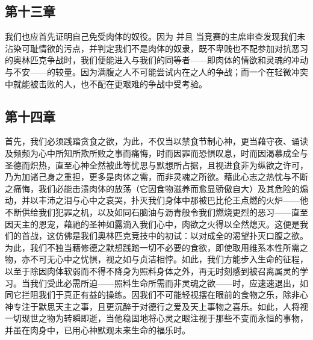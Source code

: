 
\subsection{第十三章}

\par

我们也应首先证明自己免受肉体的奴役。因为  并且  当竞赛的主席审查发现我们未沾染可耻情欲的污点，并判定我们不是肉体的奴隶，既不卑贱也不配参加对抗恶习的奥林匹克争战时，我们便能进入与我们的同等者——即肉体的情欲和灵魂的冲动与不安——的较量。因为满腹之人不可能尝试内在之人的争战；而一个在轻微冲突中就能被击败的人，也不配在更艰难的争战中受考验。\par


\subsection{第十四章}

\par

首先，我们必须践踏贪食之欲，为此，不仅当以禁食节制心神，更当藉守夜、诵读及频频为心中所知所欺所败之事而痛悔，时而因罪而恐惧叹息，时而因渴慕成全与圣德而炽热，直至心神全然被此等忧思与默想所占据，且视进食非为纵欲之许可，乃为加诸己身之重担，更多是肉体之需，而非灵魂之所欲。藉此心志之热忱与不断之痛悔，我们必能击溃肉体的放荡（它因食物滋养而愈显骄傲自大）及其危险的煽动，并以丰沛之泪与心中之哀哭，扑灭我们身体中那被巴比伦王点燃的火炉——他不断供给我们犯罪之机，以及如同石脑油与沥青般令我们燃烧更烈的恶习——直至因天主的恩宠，藉祂的圣神如露滴入我们心中，肉欲之火得以全然熄灭。这便是我们的首战，这仿佛是我们奥林匹克竞技中的初试：以对成全的渴望扑灭口腹之欲。为此，我们不独当藉修德之默想践踏一切不必要的食欲，即使取用维系本性所需之物，亦不可无心中之忧惧，视之如与贞洁相悖。如此，我们方能步入生命的征程，以至于除因肉体软弱而不得不降身为照料身体之外，再无时刻感到被召离属灵的学习。当我们受此必需所迫——照料生命所需而非灵魂之欲——时，应速速退出，如同它拦阻我们于真正有益的操练。因我们不可能轻视摆在眼前的食物之乐，除非心神专注于默思天主之事，且更沉醉于对德行之爱及天上事物之喜乐。如此，人将视一切现世之物为转瞬即逝，当他稳固地将心灵之眼注视于那些不变而永恒的事物，并虽在肉身中，已用心神默观未来生命的福乐时。\par

